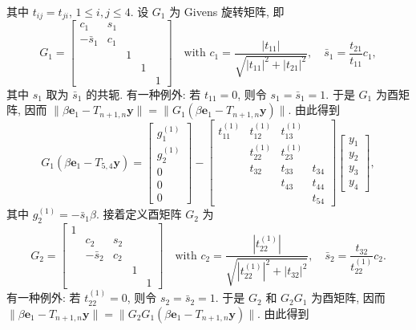 {其中 $t_{ij}=t_{ji}$, $1\le i,j\le4$. 设 $G_1$ 为 Givens 旋转矩阵, 即}
\[G_1=\begin{bmatrix}c_1&s_1&&&\\-\bar s_1&c_1&&&\\&&1&&\\&&&1&\\&&&&1\end{bmatrix}
\quad\text{with }c_1=\frac{|t_{11}|}{\sqrt{|t_{11}|^2+|t_{21}|^2}},\quad\bar s_1=\frac{t_{21}}{t_{11}}c_1,\]
{其中 $s_1$ 取为 $\bar s_1$ 的共轭. 有一种例外: 若 $t_{11}=0$, 则令 $s_1=\bar s_1=1$. 于是 $G_1$ 为酉矩阵, 因而 $\|\beta\bm e_1-T_{n+1,n}\bm y\|=\|G_1(\beta\bm e_1-T_{n+1,n}\bm y)\|$. 由此得到}
\[G_1(\beta\bm e_1-T_{5,4}\bm y)=\begin{bmatrix}g_1^{(1)}\\g_2^{(1)}\\0\\0\\0\end{bmatrix}
-\begin{bmatrix}t_{11}^{(1)}&t_{12}^{(1)}&t_{13}^{(1)}&\\&t_{22}^{(1)}&t_{23}^{(1)}&\\&t_{32}&t_{33}&t_{34}\\&&t_{43}&t_{44}\\&&&t_{54}\end{bmatrix}\begin{bmatrix}y_1\\y_2\\y_3\\y_4\end{bmatrix},\]
{其中 $g_2^{(1)}=-\bar s_1\beta$. 接着定义酉矩阵 $G_2$ 为}
\[G_2=\begin{bmatrix}1&&&&\\&c_2&s_2&&\\&-\bar s_2&c_2&&\\&&&1&\\&&&&1\end{bmatrix}
\quad\text{with }c_2=\frac{|t_{22}^{(1)}|}{\sqrt{|t_{22}^{(1)}|^2+|t_{32}|^2}},\quad\bar s_2=\frac{t_{32}}{t_{22}^{(1)}}c_2.\]
{有一种例外: 若 $t_{22}^{(1)}=0$, 则令 $s_2=\bar s_2=1$. 于是 $G_2$ 和 $G_2G_1$ 为酉矩阵, 因而 $\|\beta\bm e_1-T_{n+1,n}\bm y\|=\|G_2G_1(\beta\bm e_1-T_{n+1,n}\bm y)\|$. 由此得到}
